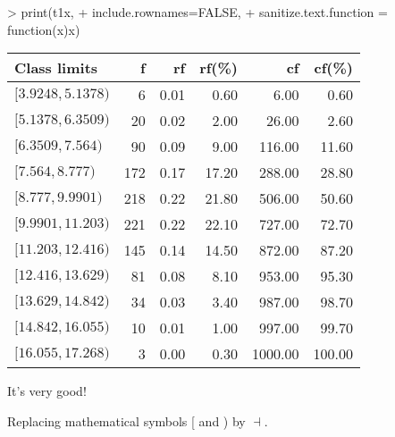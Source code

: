 \documentclass[10pt,a4paper]{article}
\begin{document}
\begin{Schunk}
\begin{Sinput}
> print(t1x,
+       include.rownames=FALSE,
+       sanitize.text.function = function(x){x})
\end{Sinput}
% latex table generated in R 4.4.0 by xtable 1.8-4 package
% Fri Nov 17 16:34:40 2023
\begin{table}[ht]
\centering
\begin{tabular}{lrrrrr}
  \hline
Class limits & f & rf & rf(\%) & cf & cf(\%) \\ 
  \hline
$[3.9248,5.1378)$ &   6 & 0.01 & 0.60 & 6.00 & 0.60 \\ 
  $[5.1378,6.3509)$ &  20 & 0.02 & 2.00 & 26.00 & 2.60 \\ 
  $[6.3509,7.564)$ &  90 & 0.09 & 9.00 & 116.00 & 11.60 \\ 
  $[7.564,8.777)$ & 172 & 0.17 & 17.20 & 288.00 & 28.80 \\ 
  $[8.777,9.9901)$ & 218 & 0.22 & 21.80 & 506.00 & 50.60 \\ 
  $[9.9901,11.203)$ & 221 & 0.22 & 22.10 & 727.00 & 72.70 \\ 
  $[11.203,12.416)$ & 145 & 0.14 & 14.50 & 872.00 & 87.20 \\ 
  $[12.416,13.629)$ &  81 & 0.08 & 8.10 & 953.00 & 95.30 \\ 
  $[13.629,14.842)$ &  34 & 0.03 & 3.40 & 987.00 & 98.70 \\ 
  $[14.842,16.055)$ &  10 & 0.01 & 1.00 & 997.00 & 99.70 \\ 
  $[16.055,17.268)$ &   3 & 0.00 & 0.30 & 1000.00 & 100.00 \\ 
   \hline
\end{tabular}
\end{table}\end{Schunk}

It's very good!

Replacing mathematical symbols [ and ) by $\dashv$.
\end{document}
